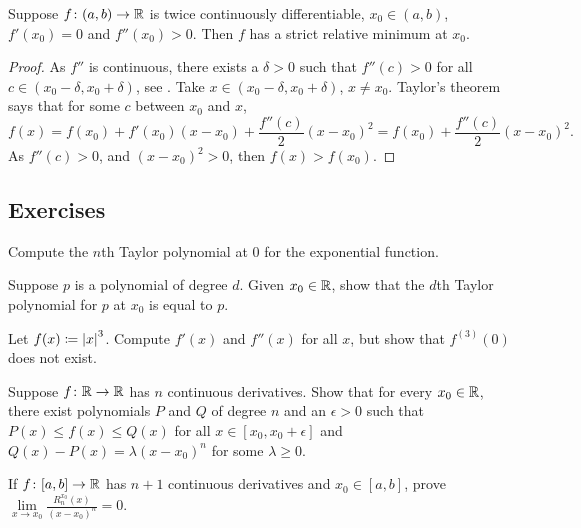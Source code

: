 \begin{prop}
Suppose $f \colon (a,b) \to {\mathbb{R}}$ is twice continuously differentiable,
$x_0 \in (a,b)$, $f'(x_0) = 0$ and $f''(x_0) > 0$.  Then $f$ has a strict relative
minimum at $x_0$.
\end{prop}

\begin{proof}
As $f''$ is continuous, there exists a $\delta > 0$
such that $f''(c) > 0$ for all $c \in (x_0-\delta,x_0+\delta)$,
see .
Take $x \in (x_0-\delta,x_0+\delta)$, $x \not= x_0$.
Taylor's theorem says that for some $c$ between $x_0$ and $x$,
\begin{equation*}
f(x) 
=
f(x_0) + f'(x_0) (x-x_0) +
\frac{f''(c)}{2}{(x-x_0)}^{2} 
=
f(x_0) + \frac{f''(c)}{2}{(x-x_0)}^{2}  .
\end{equation*}
As $f''(c) > 0$, and ${(x-x_0)}^2 > 0$, then $f(x) > f(x_0)$.
\end{proof}

\subsection{Exercises}

\begin{exercise}
Compute the $n$th Taylor polynomial at $0$ for the exponential function.
\end{exercise}

\begin{exercise}
Suppose $p$ is a polynomial of degree $d$.  Given $x_0 \in {\mathbb{R}}$,
show that
the $d$th Taylor polynomial for $p$ at $x_0$ is equal to $p$.
\end{exercise}

\begin{exercise}
Let $f(x) \coloneqq \left\lvert {x} \right\rvert^3$.  Compute $f'(x)$ and $f''(x)$ for all $x$,
but show that $f^{(3)}(0)$ does not exist.
\end{exercise}

\begin{exercise}
Suppose $f \colon {\mathbb{R}} \to {\mathbb{R}}$ has $n$ continuous derivatives.  Show
that for every $x_0 \in {\mathbb{R}}$,
there exist polynomials $P$ and $Q$ of degree $n$ and 
an $\epsilon > 0$ such that $P(x) \leq f(x) \leq Q(x)$ for all $x \in
[x_0,x_0+\epsilon]$  and
$Q(x)-P(x) = \lambda {(x-x_0)}^n$ for some $\lambda \geq 0$.
\end{exercise}

\begin{exercise}
If $f \colon [a,b] \to {\mathbb{R}}$ has $n+1$ continuous derivatives
and $x_0 \in [a,b]$,
prove
$\lim\limits_{x\to x_0} \frac{R_n^{x_0}(x)}{{(x-x_0)}^n} = 0$.
\end{exercise}

